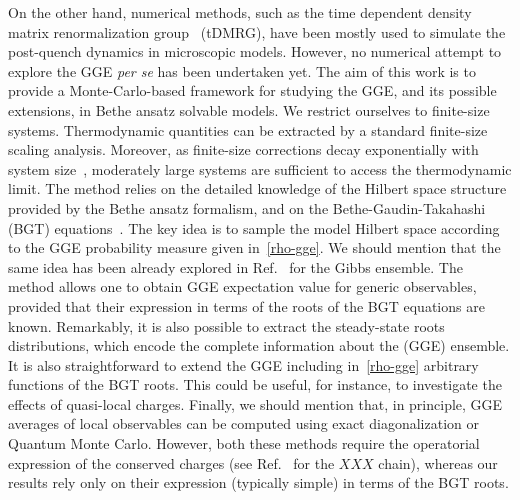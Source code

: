 \documentclass[twocolumn,superscriptaddress,prb,10pt]{revtex4-1}
\begin{document}
On the other hand, numerical methods, such as the time dependent density 
matrix renormalization group~\cite{white-2004,daley-2004} (tDMRG), have been mostly 
used to simulate the post-quench dynamics in microscopic models. However, no numerical 
attempt to explore the GGE {\it per se} has been undertaken yet. The aim of this work is to 
provide a Monte-Carlo-based framework for studying the GGE, and its possible extensions,   
in Bethe ansatz solvable models. We restrict ourselves to finite-size systems.  
Thermodynamic quantities can be extracted by a standard finite-size scaling analysis. 
Moreover, as finite-size corrections decay exponentially with system size~\cite{iyer-2015}, 
moderately large systems are sufficient to access the thermodynamic limit. 
The method relies on the detailed knowledge of the Hilbert space structure provided by 
the Bethe ansatz formalism, and on the Bethe-Gaudin-Takahashi (BGT) equations~\cite{takahashi-1971,
taka-book}. The key idea is to sample the model Hilbert space according to 
the GGE probability measure given in~\eqref{rho-gge}. We should mention that the same 
idea has been already explored in Ref.~ for the Gibbs ensemble.
The method allows one to obtain GGE expectation value for generic observables, provided 
that their expression in terms of the roots of the BGT equations are known. Remarkably, 
it is also possible to extract the steady-state roots distributions, which encode 
the complete information about the (GGE) ensemble. It is also straightforward to extend 
the GGE including in~\eqref{rho-gge} arbitrary functions of the BGT roots. This could 
be useful, for instance, to investigate the effects of quasi-local charges. Finally, 
we should mention that, in principle, GGE averages of local observables can be computed 
using exact diagonalization or Quantum Monte Carlo. However, both these methods require 
the operatorial expression of the conserved charges (see Ref.~ 
for the $XXX$ chain), whereas our results rely only on their expression (typically simple) 
in terms of the BGT roots. 
\end{document}
